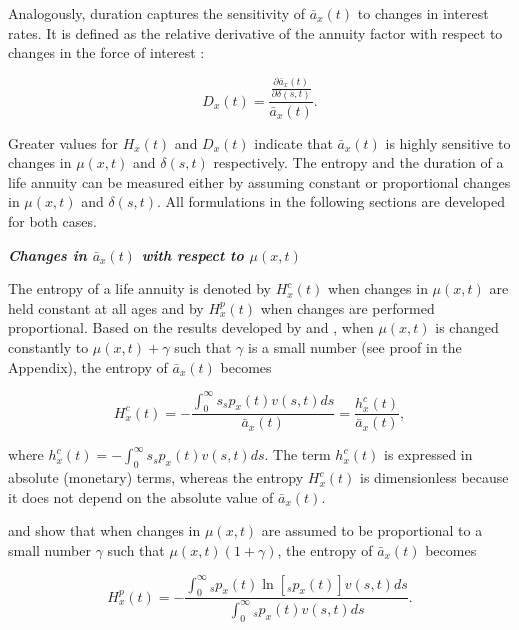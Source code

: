 \documentclass[12pt]{article}
\begin{document}
Analogously, duration captures the sensitivity of $\bar{a}_x(t)$ to changes in interest rates. It is defined as the relative derivative of the annuity factor with respect to changes in the force of interest \citep{Milevsky2012,Milevsky2012a}:


\begin{equation}\label{eq:DurationGeneral}
{D}_{x}(t) = \frac{ \frac{\partial \bar{a}_x(t) }{\partial \delta(s,t)}}{\bar{a}_x(t)}.
\end{equation}

Greater values for ${H}_{x}(t)$ and ${D}_{x}(t)$ indicate that $\bar{a}_x(t)$ is highly sensitive to changes in $\mu(x,t)$ and $\delta(s,t)$ respectively. The entropy and the duration of a life annuity can be measured either by assuming constant or proportional changes in $\mu(x,t)$ and $\delta(s,t)$. All formulations in the following sections are developed for both cases. 



\textit{\textbf{{Changes in $\bar{a}_x(t)$ with respect to $\mu(x,t)$}}}

The entropy of a life annuity is denoted by ${H}^{c}_{x}(t)$ when changes in $\mu(x,t)$ are held constant at all ages and by ${H}^{p}_{x}(t)$ when changes are performed proportional. Based on the results developed by \citet{Tsai2013a} and \citet{Lin2020}, when $\mu(x,t)$ is changed constantly to $\mu(x,t)+\gamma$ such that $\gamma$ is a small number (see proof in the Appendix), the entropy of $\bar{a}_x(t)$ becomes

\begin{equation}\label{eq:EntropyC}
{H}^{c}_{x}(t) = -\frac{\int_{0}^\infty s {}_sp_x(t) {v}(s,t) ds}{\bar{a}_x(t)}=\frac{{h}^{c}_{x}(t)}{\bar{a}_x(t)},
\end{equation}

where ${h}^{c}_{x}(t)=-\int_{0}^\infty s {}_sp_x(t) {v}(s,t) ds$. The term ${h}^{c}_{x}(t)$ is expressed in absolute (monetary) terms, whereas the entropy ${H}^{c}_{x}(t)$ is dimensionless because it does not depend on the absolute value of $\bar{a}_x(t)$.


\citet{Haberman2011} and \citet{Tsai2013a} show that when changes in $\mu(x,t)$ are assumed to be proportional to a small number $\gamma$ such that $\mu(x,t)(1+\gamma)$, the entropy of $\bar{a}_x(t)$ becomes

\begin{equation} \label{eq:EntropyP}
{H}^{p}_{x}(t) = -\frac{ \int_{0}^{\infty}{}_sp_x(t)\ln[{}_sp_x(t)] {v}(s,t) ds}{\int_0^\infty {}_sp_x(t) {v}(s,t) ds}.
\end{equation}
\end{document}
